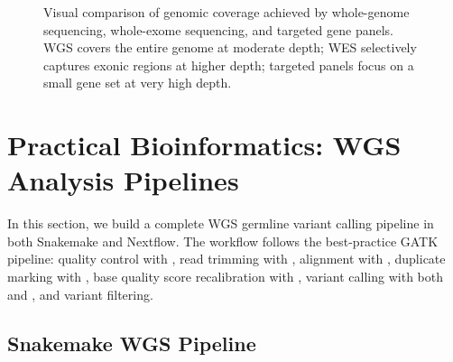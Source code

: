 \begin{figure}[htbp]
\begin{tikzpicture}
\end{tikzpicture}
\caption{Visual comparison of genomic coverage achieved by whole-genome sequencing, whole-exome sequencing, and targeted gene panels. WGS covers the entire genome at moderate depth; WES selectively captures exonic regions at higher depth; targeted panels focus on a small gene set at very high depth.}
\label{fig:wgs_wes_panel}
\end{figure}

\section{Practical Bioinformatics: WGS Analysis Pipelines}
\label{sec:wgs_pipeline}

In this section, we build a complete WGS germline variant calling pipeline in both Snakemake and Nextflow. The workflow follows the best-practice GATK pipeline: quality control with , read trimming with , alignment with , duplicate marking with , base quality score recalibration with , variant calling with both  and , and variant filtering.

\subsection{Snakemake WGS Pipeline}

